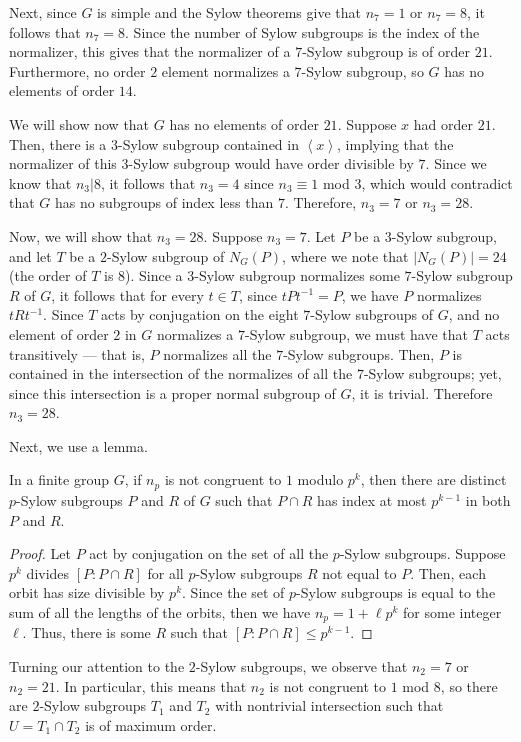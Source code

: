 \documentclass[10pt]{mypackage}
\begin{document}
Next, since $G$ is simple and the Sylow theorems give that $n_7 = 1$ or $n_7 = 8$, it follows that $n_7 = 8$. Since the number of Sylow subgroups is the index of the normalizer, this gives that the normalizer of a $7$-Sylow subgroup is of order $21$. Furthermore, no order $2$ element normalizes a $7$-Sylow subgroup, so $G$ has no elements of order $14$.

We will show now that $G$ has no elements of order $21$. Suppose $x$ had order $21$. Then, there is a $3$-Sylow subgroup contained in $ \left\langle x \right\rangle $, implying that the normalizer of this $3$-Sylow subgroup would have order divisible by $7$. Since we know that $n_3 | 8$, it follows that $n_3 = 4$ since $n_3\equiv 1$ mod $3$, which would contradict that $G$ has no subgroups of index less than $7$. Therefore, $n_3 = 7$ or $n_3 = 28$.

Now, we will show that $n_3 = 28$. Suppose $n_3 = 7$. Let $P$ be a $3$-Sylow subgroup, and let $T$ be a $2$-Sylow subgroup of $N_G(P)$, where we note that $\left\vert N_G(P) \right\vert = 24$ (the order of $T$ is $8$). Since a $3$-Sylow subgroup normalizes some $7$-Sylow subgroup $R$ of $G$, it follows that for every $t\in T$, since $tPt^{-1} = P$, we have $P$ normalizes $tRt^{-1}$. Since $T$ acts by conjugation on the eight $7$-Sylow subgroups of $G$, and no element of order $2$ in $G$ normalizes a $7$-Sylow subgroup, we must have that $T$ acts transitively --- that is, $P$ normalizes all the $7$-Sylow subgroups. Then, $P$ is contained in the intersection of the normalizes of all the $7$-Sylow subgroups; yet, since this intersection is a proper normal subgroup of $G$, it is trivial. Therefore $n_3 = 28$.

Next, we use a lemma.
\begin{lemma}
  In a finite group $G$, if $n_p$ is not congruent to $1$ modulo $p^{k}$, then there are distinct $p$-Sylow subgroups $P$ and $R$ of $G$ such that $P\cap R$ has index at most $p^{k-1}$ in both $P$ and $R$.
\end{lemma}
\begin{proof}
  Let $P$ act by conjugation on the set of all the $p$-Sylow subgroups. Suppose $p^k$ divides $\left[ P:P\cap R \right]$ for all $p$-Sylow subgroups $R$ not equal to $P$. Then, each orbit has size divisible by $p^{k}$. Since the set of $p$-Sylow subgroups is equal to the sum of all the lengths of the orbits, then we have $n_p = 1 + \ell p^{k}$ for some integer $\ell$. Thus, there is some $R$ such that $\left[ P:P\cap R \right] \leq p^{k-1}$.
\end{proof}
Turning our attention to the $2$-Sylow subgroups, we observe that $n_2 = 7$ or $n_2 = 21$. In particular, this means that $n_2$ is not congruent to $1$ mod $8$, so there are $2$-Sylow subgroups $T_1$ and $T_2$ with nontrivial intersection such that $U = T_1\cap T_2$ is of maximum order.
\end{document}
